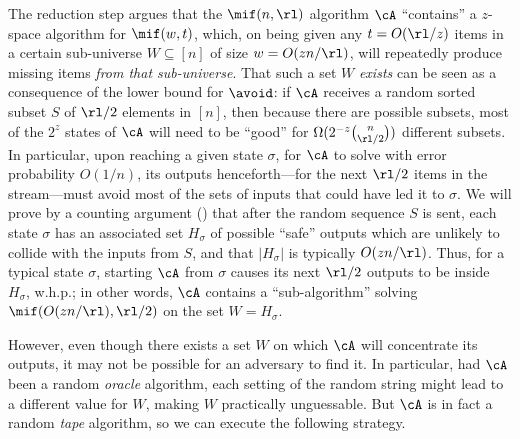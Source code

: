 \begin{itemize}
\begin{itemize}
 The reduction step argues that the $\mif(n,\rl)$
algorithm $\cA$ ``contains'' a $z$-space algorithm for $\mif(w,t)$, which, on
being given any $t = O(\rl / z)$ items in a certain sub-universe $W \subseteq
[n]$ of size $w = O(z n / \rl)$, will repeatedly produce missing items {\em
from that sub-universe}.  That such a set $W$ \emph{exists} can be seen as a
consequence of the lower bound for $\avoid$: if $\cA$ receives a random sorted
subset $S$ of $\rl/2$ elements in $[n]$, then because there are
 possible subsets, most of the $2^z$ states of $\cA$
will need to be ``good'' for $\Omega(2^{-z} \binom{n}{\rl/2})$ different
subsets. In particular, upon reaching a given state $\sigma$, for $\cA$ to
solve \mif with error probability $O(1/n)$, its outputs henceforth---for the
next $\rl/2$ items in the stream---must avoid most of the sets of inputs that
could have led it to $\sigma$.  We will prove by a counting argument
() that after the random sequence $S$ is sent, each
state $\sigma$ has an associated set $H_\sigma$ of possible ``safe'' outputs
which are unlikely to collide with the inputs from $S$, and that $|H_\sigma|$
is typically $O(z n / \rl)$. Thus, for a typical state $\sigma$, starting
$\cA$ from $\sigma$ causes its next $\rl/2$ outputs to be inside $H_\sigma$,
w.h.p.; in other words, $\cA$ contains a ``sub-algorithm'' solving $\mif(O(z n
/ \rl), \rl/2)$ on the set $W = H_\sigma$. 

However, even though there exists a set $W$ on which $\cA$ will concentrate
its outputs, it may not be possible for an adversary to find it. In
particular, had $\cA$ been a random {\em oracle} algorithm, each setting of
the random string might lead to a different value for $W$, making $W$
practically unguessable. But $\cA$ is in fact a random {\em tape} algorithm,
so we can execute the following strategy.


\end{itemize}
\end{itemize}
